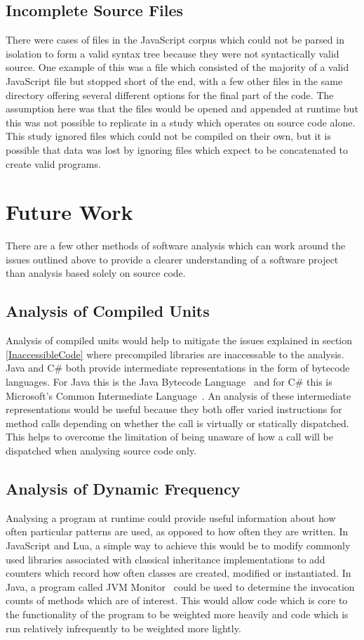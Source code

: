 \subsection{Incomplete Source Files}
There were cases of files in the JavaScript corpus which could not be parsed in isolation to form a valid syntax tree because they were not syntactically valid source. One example of this was a file which consisted of the majority of a valid JavaScript file but stopped short of the end, with a few other files in the same directory offering several different options for the final part of the code. The assumption here was that the files would be opened and appended at runtime but this was not possible to replicate in a study which operates on source code alone. This study ignored files which could not be compiled on their own, but it is possible that data was lost by ignoring files which expect to be concatenated to create valid programs.

\section{Future Work}
There are a few other methods of software analysis which can work around the issues outlined above to provide a clearer understanding of a software project than analysis based solely on source code.

\subsection{Analysis of Compiled Units}
Analysis of compiled units would help to mitigate the issues explained in section \ref{InaccessibleCode} where precompiled libraries are inaccessable to the analysis. Java and C\# both provide intermediate representations in the form of bytecode languages. For Java this is the Java Bytecode Language~\cite{JVMSpec} and for C\# this is Microsoft's Common Intermediate Language~\cite{CommonIntermediateLanguage}. An analysis of these intermediate representations would be useful because they both offer varied instructions for method calls depending on whether the call is virtually or statically dispatched. This helps to overcome the limitation of being unaware of how a call will be dispatched when analysing source code only.

\subsection{Analysis of Dynamic Frequency}
Analysing a program at runtime could provide useful information about how often particular patterns are used, as opposed to how often they are written. In JavaScript and Lua, a simple way to achieve this would be to modify commonly used libraries associated with classical inheritance implementations to add counters which record how often classes are created, modified or instantiated. In Java, a program called JVM Monitor~\cite{JVMMonitor} could be used to determine the invocation counts of methods which are of interest. This would allow code which is core to the functionality of the program to be weighted more heavily and code which is run relatively infrequently to be weighted more lightly.

